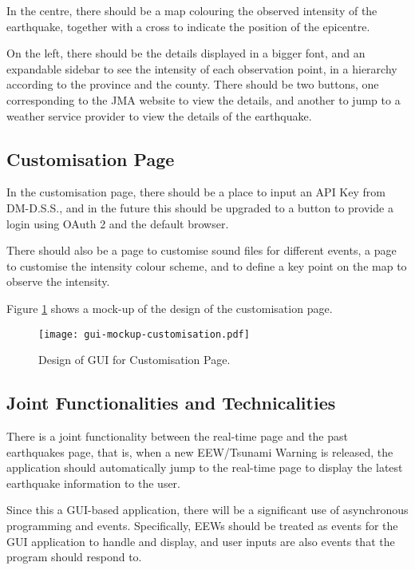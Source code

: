 In the centre, there should be a map colouring the observed intensity of the earthquake, together with a cross to indicate the position of the epicentre.

On the left, there should be the details displayed in a bigger font, and an expandable sidebar to see the intensity of each observation point, in a hierarchy according to the province and the county. There should be two buttons, one corresponding to the JMA website to view the details, and another to jump to a weather service provider to view the details of the earthquake.

\subsection{Customisation Page}

In the customisation page, there should be a place to input an API Key from DM-D.S.S., and in the future this should be upgraded to a button to provide a login using OAuth 2 and the default browser.

There should also be a page to customise sound files for different events, a page to customise the intensity colour scheme, and to define a key point on the map to observe the intensity.

Figure \ref{fig:gui-mockup-customisation} shows a mock-up of the design of the customisation page.

\begin{figure}[htp]
    \centering
    \texttt{[image: gui-mockup-customisation.pdf]}
    \caption{Design of GUI for Customisation Page.}
    \label{fig:gui-mockup-customisation}
\end{figure}

\subsection{Joint Functionalities and Technicalities}

There is a joint functionality between the real-time page and the past earthquakes page, that is, when a new EEW/Tsunami Warning is released, the application should automatically jump to the real-time page to display the latest earthquake information to the user.

Since this a GUI-based application, there will be a significant use of asynchronous programming and events. Specifically, EEWs should be treated as events for the GUI application to handle and display, and user inputs are also events that the program should respond to.

